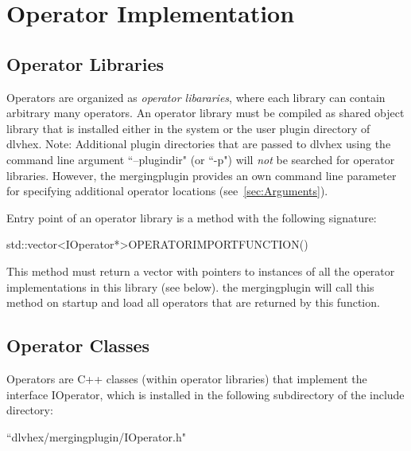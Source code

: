 \documentclass[a4paper,11pt]{article}
\theoremstyle{definition}
\newcommand{\dlvhex}{\textsf{dlvhex}\xspace }
\newcommand{\inlinecode}[1]{\textsf{#1}\xspace }
\begin{document}
	\section{Operator Implementation}
	\label{sec:Operators}

	
		\subsection{Operator Libraries}
	
		Operators are organized as \emph{operator libararies}, where each library can contain arbitrary many operators. An operator library must be compiled as shared object library
		that is installed either in the system or the user plugin directory of \dlvhex.
		Note: Additional plugin directories that are passed to \dlvhex using the command line argument ``--plugindir" (or ``-p") will \emph{not} be searched for operator libraries.
		However, the mergingplugin provides an own command line parameter for specifying additional operator locations (see~\ref{sec:Arguments}).
		
		Entry point of an operator library is a method with the following signature:
		\begin{center}
			\inlinecode{std::vector\textless IOperator*\textgreater OPERATORIMPORTFUNCTION()}
		\end{center}
		This method must return a vector with pointers to instances of all the operator implementations in this library (see below). the mergingplugin will call this method on
		startup and load all operators that are returned by this function.
		

		\subsection{Operator Classes}

		Operators are C++ classes (within operator libraries) that implement the interface \inlinecode{IOperator}, which is installed in the following subdirectory of the include
		directory:
		
		\begin{center}
			``dlvhex/mergingplugin/IOperator.h"
		\end{center}
	  	
\end{document}
